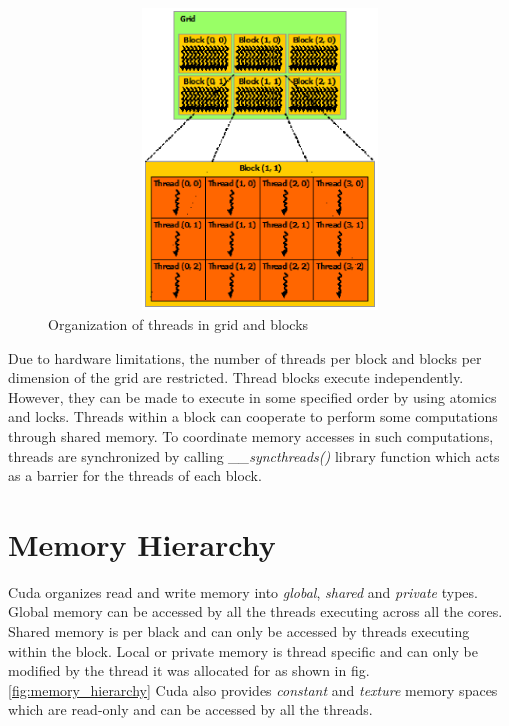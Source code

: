 \documentclass[MTech]{iitmdiss}
\begin{document}
\begin{figure}
    \centering
    \includegraphics[width=12cm, height=8cm]{grid_of_thread_blocks}
    \caption{Organization of threads in grid and blocks}
    \label{fig:thread_block_grid}
\end{figure}

Due to hardware limitations, the number of threads per block and blocks per dimension of the grid are restricted. Thread blocks execute independently. However, they can be made to execute in some specified order by using atomics and locks.
Threads within a block can cooperate to perform some computations through shared memory. To coordinate memory accesses in such computations, threads are synchronized by calling \textit{\_\_syncthreads()} library function which acts as a barrier for the threads of each block. 

\section{Memory Hierarchy}
Cuda organizes  read and write memory into \textit{global}, \textit{shared} and \textit{private} types. Global memory can be accessed by all the threads executing across all the cores. Shared memory is per black and can only be accessed by threads executing within the block. Local or private memory is thread specific and can only be modified by the thread it was allocated for as shown in fig. \ref{fig:memory_hierarchy} Cuda also provides \textit{constant} and \textit{texture} memory spaces which are read-only and can be accessed by all the threads.  
\end{document}
